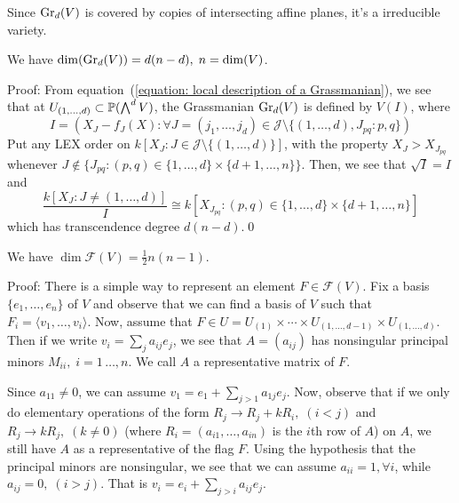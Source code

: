 \begin{dang}
    \begin{corollary}
        Since $\text{Gr}_d(V)$ is covered by copies of intersecting affine planes, it's a irreducible variety.
    \end{corollary}
\end{dang}

\begin{dang}
    \begin{proposition}
        We have $\dim (\text{Gr}_d(V)) = d(n-d),\; n=\dim(V)$.
    \end{proposition}
\end{dang}
Proof: From equation~(\ref{equation: local description of a Grassmanian}), we see that at $U_{(1,\dots,d)}\subset \mathbb{P}(\bigwedge^dV)$, 
the Grassmanian $\text{Gr}_d(V)$ is defined by $V(I)$, where
\begin{equation}
    I = (X_J-f_J(X):\forall J=(j_1,\dots,j_d)\in\mathcal{J}\setminus\{(1,\dots,d), J_{pq}: p,q\})
\end{equation}
Put any LEX order on $k[X_J:J\in\mathcal{J}\setminus\{(1,\dots,d)\}]$, with the property 
$X_J> X_{J_{pq}}$ whenever 
$J\notin \{J_{pq}: (p,q)\in\{1,\dots,d\}\times\{d+1,\dots,n\}\}$. Then, we see that $\sqrt{I}=I$ and 
\begin{equation}
    \frac{k[X_J:J\neq (1,\dots,d)]}{I}\cong k[X_{J_{pq}}: (p,q)\in\{1,\dots,d\}\times\{d+1,\dots,n\}]
\end{equation} 
which has transcendence degree $d(n-d)$.\qed


\begin{dang}
    \begin{proposition}
        We have $\dim\mathcal{F}(V)=\frac12 n(n-1)$.
    \end{proposition}
\end{dang}
Proof: There is a simple way to represent an element $F\in \mathcal{F}(V)$. Fix a basis $\{e_1,\dots,e_n\}$ of $V$
and observe that we can find a basis of $V$ such that $F_i=\langle v_1,\dots, v_i\rangle$. Now, assume 
that $F\in U=U_{(1)}\times \cdots \times U_{(1,\dots,d-1)}\times U_{(1,\dots,d)}$. Then if we write 
$v_i = \sum_ja_{ij}e_j$, we see that $A=(a_{ij})$ has nonsingular principal minors $M_{ii},\;i=1\,\dots,n$. 
We call $A$ a representative matrix of $F$.\par  
Since $a_{11}\neq0$, we can assume $v_1=e_1+\sum_{j>1}a_{1j}e_j$. Now, observe that if we only do elementary operations 
of the form $R_j\to R_j + kR_i,\;(i<j)$ and $R_j\to kR_j,\;(k\neq0)$ (where $R_i=(a_{i1},\dots,a_{in})$ is the $i$th row of $A$) on $A$, we 
still have $A$ as a representative of the flag $F$. Using the hypothesis that the principal minors are nonsingular, we see that 
we can assume $a_{ii}=1,\forall i$, while $a_{ij}=0,\;(i>j)$. That is $v_i=e_i+\sum_{j>i}a_{ij}e_j$.\par 


